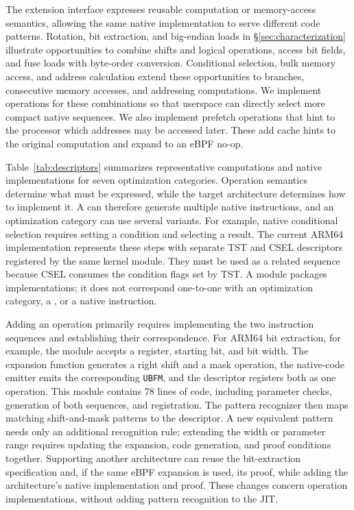 The extension interface expresses reusable computation or memory-access semantics, allowing the same native implementation to serve different code patterns. Rotation, bit extraction, and big-endian loads in \S\ref{sec:characterization} illustrate opportunities to combine shifts and logical operations, access bit fields, and fuse loads with byte-order conversion. Conditional selection, bulk memory access, and address calculation extend these opportunities to branches, consecutive memory accesses, and addressing computations. We implement operations for these combinations so that userspace can directly select more compact native sequences. We also implement prefetch operations that hint to the processor which addresses may be accessed later. These add cache hints to the original computation and expand to an eBPF no-op.

Table~\ref{tab:descriptors} summarizes representative computations and native implementations for seven optimization categories. Operation semantics determine what must be expressed, while the target architecture determines how to implement it. A \kinsn can therefore generate multiple native instructions, and an optimization category can use several \kinsn variants. For example, native conditional selection requires setting a condition and selecting a result. The current ARM64 implementation represents these steps with separate TST and CSEL descriptors registered by the same kernel module. They must be used as a related sequence because CSEL consumes the condition flags set by TST. A module packages implementations; it does not correspond one-to-one with an optimization category, a \kinsn, or a native instruction.



Adding an operation primarily requires implementing the two instruction sequences and establishing their correspondence. For ARM64 bit extraction, for example, the module accepts a register, starting bit, and bit width. The expansion function generates a right shift and a mask operation, the native-code emitter emits the corresponding \texttt{UBFM}, and the descriptor registers both as one operation. This module contains 78 lines of code, including parameter checks, generation of both sequences, and registration. The pattern recognizer then maps matching shift-and-mask patterns to the descriptor. A new equivalent pattern needs only an additional recognition rule; extending the width or parameter range requires updating the expansion, code generation, and proof conditions together. Supporting another architecture can reuse the bit-extraction specification and, if the same eBPF expansion is used, its proof, while adding the architecture's native implementation and proof. These changes concern operation implementations, without adding pattern recognition to the JIT.